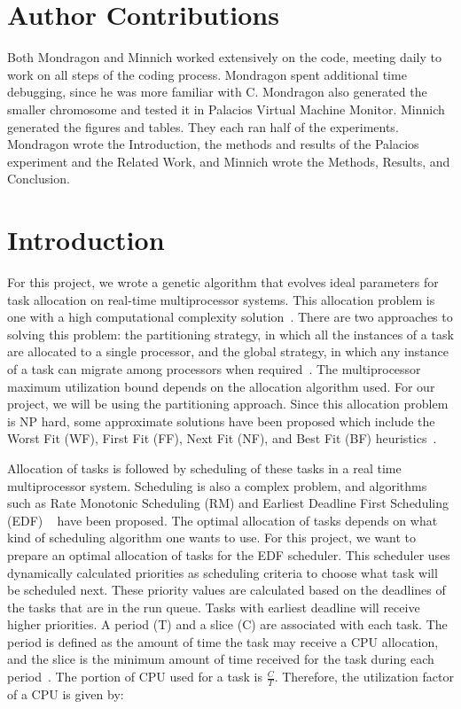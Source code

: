 \documentclass[11pt]{article}
\begin{document}
\maketitle
\doublespacing

\section{Author Contributions}
Both Mondragon and Minnich worked extensively on the code, meeting daily to work on all steps of the coding process. Mondragon spent additional time debugging, since he was more familiar with C. Mondragon also generated the smaller chromosome and tested it in Palacios Virtual Machine Monitor. Minnich generated the figures and tables. They each ran half of the experiments. Mondragon wrote the Introduction, the methods and results of the Palacios experiment and the Related Work, and Minnich wrote the Methods, Results, and Conclusion.

\section{Introduction}

For this project, we wrote a genetic algorithm that evolves ideal parameters for task allocation on real-time multiprocessor systems. This allocation problem is one with a high computational complexity solution~\cite{Mondragon:13}. There are two approaches to solving this problem: the partitioning strategy, in which all the instances of a task are allocated to a single processor, and the global strategy, in which any instance of a task can migrate among processors when required~\cite{Lopez:04}. The multiprocessor maximum utilization bound depends on the allocation algorithm used. For our project, we will be using the partitioning approach.  Since this allocation problem is NP hard, some approximate solutions have been proposed which include the Worst Fit (WF), First Fit (FF), Next Fit (NF), and Best Fit (BF) heuristics~\cite{Zapata:05}. 

Allocation of tasks is followed by scheduling of these tasks in a real time multiprocessor system. Scheduling is also a complex problem, and algorithms such as Rate Monotonic Scheduling (RM) and Earliest Deadline First Scheduling (EDF) ~\cite{Dall:78} have been proposed. The optimal allocation of tasks depends on what kind of scheduling algorithm one wants to use. For this project, we want to prepare an optimal allocation of tasks for the EDF scheduler. This scheduler uses dynamically calculated priorities as scheduling criteria to choose what task will be scheduled next. These priority values are calculated based on the deadlines of the tasks that are in the run queue. Tasks with earliest deadline will receive higher priorities. A period (T) and a slice (C) are associated with each task. The period is defined as the amount of time the task may receive a CPU allocation, and the slice is the minimum amount of time received for the task during each period~\cite{Chung:73}. The portion of CPU used for a task is $\frac{C}{T}$. Therefore, the utilization factor of a CPU is given by: 
\end{document}
